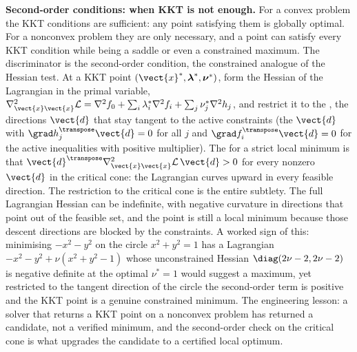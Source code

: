 \begin{mastery}
\textbf{Second-order conditions: when KKT is not enough.} For a convex
problem the KKT conditions are sufficient: any point satisfying them is
globally optimal. For a nonconvex problem they are only necessary, and
a point can satisfy every KKT condition while being a saddle or even a
constrained maximum. The discriminator is the second-order condition,
the constrained analogue of the Hessian test. At a KKT point
$(\vect{x}^{*}, \boldsymbol{\lambda}^{*}, \boldsymbol{\nu}^{*})$, form
the Hessian of the Lagrangian in the primal variable, $\nabla^{2}_{
\vect{x}\vect{x}} \mathcal{L} = \nabla^{2} f_{0} + \sum_{i}
\lambda_{i}^{*} \nabla^{2} f_{i} + \sum_{j} \nu_{j}^{*} \nabla^{2}
h_{j}$, and restrict it to the , the directions
$\vect{d}$ that stay tangent to the active constraints (the $\vect{d}$
with $\grad h_{j}^{\transpose} \vect{d} = 0$ for all $j$ and $\grad
f_{i}^{\transpose} \vect{d} = 0$ for the active inequalities with
positive multiplier). The 
for a strict local minimum is that $\vect{d}^{\transpose} \nabla^{2}_{
\vect{x}\vect{x}} \mathcal{L} \, \vect{d} > 0$ for every nonzero
$\vect{d}$ in the critical cone: the Lagrangian curves upward in every
feasible direction. The restriction to the critical cone is the entire
subtlety. The full Lagrangian Hessian can be indefinite, with negative
curvature in directions that point out of the feasible set, and the
point is still a local minimum because those descent directions are
blocked by the constraints. A worked sign of this: minimising
$-x^{2} - y^{2}$ on the circle $x^{2} + y^{2} = 1$ has a Lagrangian
$-x^{2} - y^{2} + \nu(x^{2} + y^{2} - 1)$ whose unconstrained Hessian
$\diag(2\nu - 2, 2\nu - 2)$ is negative definite at the optimal $\nu^{*}
= 1$ would suggest a maximum, yet restricted to the tangent direction
of the circle the second-order term is positive and the KKT point is a
genuine constrained minimum. The engineering lesson: a solver that
returns a KKT point on a nonconvex problem has returned a candidate,
not a verified minimum, and the second-order check on the critical cone
is what upgrades the candidate to a certified local optimum.
\end{mastery}

